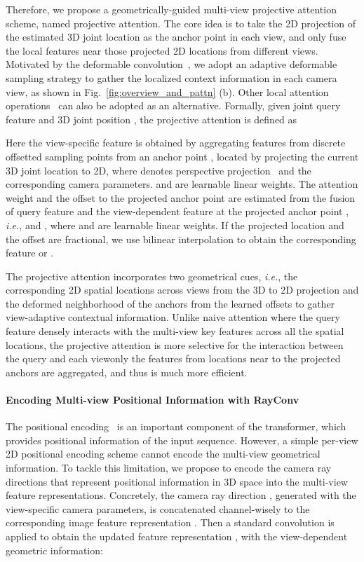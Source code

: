 \documentclass{article}
\newcommand{\ie}{\emph{i.e.}}
\begin{document}
Therefore, we propose a geometrically-guided multi-view projective attention scheme, named projective attention.
{The core idea is to take the 2D projection of the estimated 3D joint location as the anchor point in each view, and only fuse the local features near those projected 2D locations from different views.}
Motivated by the deformable convolution~\cite{dai2017deformable,zhu2019deformable}, we adopt an adaptive deformable sampling strategy to gather the localized context information in each camera view, as shown in Fig.~\ref{fig:overview_and_pattn} (b). Other local attention operations~\cite{zhao2020exploring,wu2020lite,wu2019pay} can also be adopted as an alternative. Formally, given joint query feature  and 3D joint position , the projective attention is defined as

Here the view-specific feature  is obtained by aggregating features from  discrete offsetted sampling points from an anchor point , located by projecting the current 3D joint location  to 2D, where  denotes perspective projection~\cite{Hartley2003MVG} and  the corresponding camera parameters.
 and  are learnable linear weights. 
The attention weight  and the offset to the projected anchor point  are 
estimated from
the fusion of query feature  and the view-dependent feature at the projected anchor point , \ie,  and , where  and  are learnable linear weights. 
If the projected location and the offset are fractional, we use bilinear interpolation to obtain the corresponding feature  or . 

The projective attention incorporates two geometrical cues, \ie, the corresponding 2D spatial locations across views from   the 3D to 2D projection   and   the deformed neighborhood of the anchors from the learned offsets to gather view-adaptive contextual information.  
Unlike naive attention where the query feature densely interacts with the multi-view key features across all the spatial locations, 
{the projective attention is more selective for the interaction between the query and each view\textemdash only the features from locations near to the projected anchors are aggregated, and thus is much more efficient.}

\paragraph{Encoding Multi-view Positional Information with RayConv} 
The positional encoding~\cite{vaswani2017attention} is an important component of the transformer, which provides positional information of the input sequence.
However, a simple per-view 2D positional encoding scheme cannot encode the multi-view geometrical information. 
To tackle this limitation,
we propose to encode the camera ray directions {that represent  positional information in 3D space}  into the multi-view feature representations. 
Concretely, the camera ray direction , generated with the view-specific camera parameters, 
is concatenated channel-wisely to the corresponding image feature representation . Then a standard convolution is applied to obtain the updated feature representation ,    with  the    view-dependent geometric information:
\end{document}
